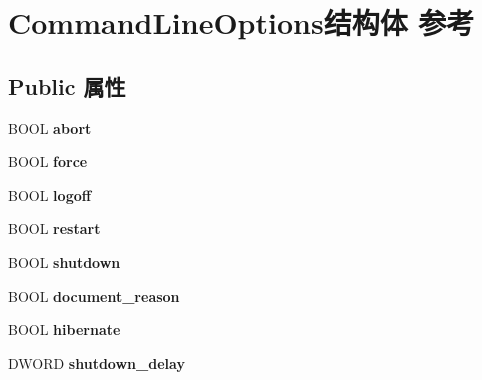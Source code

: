 \hypertarget{struct_command_line_options}{}\section{Command\+Line\+Options结构体 参考}
\label{struct_command_line_options}
\subsection*{Public 属性}
\begin{DoxyCompactItemize}
\item 
\mbox{\label{struct_command_line_options_afba09d7e21f24dc26626dd2b78e314eb}} 
B\+O\+OL {\bfseries abort}
\item 
\mbox{\label{struct_command_line_options_ab4331980c87cc03b08ae9cc62e201f73}} 
B\+O\+OL {\bfseries force}
\item 
\mbox{\label{struct_command_line_options_a024f77cd5c974b42027bddb9decefc6b}} 
B\+O\+OL {\bfseries logoff}
\item 
\mbox{\label{struct_command_line_options_acb371af7368611635181d0ad41849874}} 
B\+O\+OL {\bfseries restart}
\item 
\mbox{\label{struct_command_line_options_a1f0382255ac1df8b87306ab20880ba5e}} 
B\+O\+OL {\bfseries shutdown}
\item 
\mbox{\label{struct_command_line_options_a8945a066a2b786e417f183a4df68828b}} 
B\+O\+OL {\bfseries document\+\_\+reason}
\item 
\mbox{\label{struct_command_line_options_a10c6fc65bc4a3453a050ec01d092bebc}} 
B\+O\+OL {\bfseries hibernate}
\item 
\mbox{\label{struct_command_line_options_aeea62eda8db7a5e7c01359b2b4c6be66}} 
D\+W\+O\+RD {\bfseries shutdown\+\_\+delay}
\item 
\mbox{\label{struct_command_line_options_a04dd57fa94698aab9e974562d85bfd33}} 

\end{DoxyCompactItemize}
